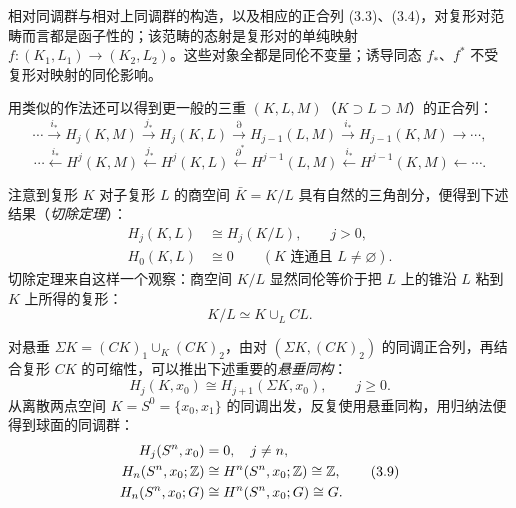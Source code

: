 相对同调群与相对上同调群的构造，以及相应的正合列 (3.3)、(3.4)，对复形对范畴而言都是函子性的；该范畴的态射是复形对的单纯映射 $f:(K_1,L_1)\to(K_2,L_2)$。这些对象全都是同伦不变量；诱导同态 $f_*$、$f^*$ 不受复形对映射的同伦影响。

用类似的作法还可以得到更一般的三重 $(K,L,M)$（$K\supset L\supset M$）的正合列：
\begin{equation}
  \cdots\xrightarrow{i_*}H_j(K,M)\xrightarrow{j_*}H_j(K,L)\xrightarrow{\partial}
  H_{j-1}(L,M)\xrightarrow{i_*}H_{j-1}(K,M)\to\cdots, \tag{3.5}
\end{equation}
\begin{equation}
  \cdots\xleftarrow{i_*}H^j(K,M)\xleftarrow{j_*}H^j(K,L)\xleftarrow{\partial^*}
  H^{j-1}(L,M)\xleftarrow{i_*}H^{j-1}(K,M)\leftarrow\cdots . \tag{3.6}
\end{equation}

注意到复形 $K$ 对子复形 $L$ 的商空间 $\bar K=K/L$ 具有自然的三角剖分，便得到下述结果（\emph{切除定理}）：
\begin{equation}
  \begin{aligned}
    H_j(K,L)&\cong H_j(K/L),\qquad j>0,\\
    H_0(K,L)&\cong 0\qquad(\text{$K$ 连通且 }L\neq\varnothing).
  \end{aligned} \tag{3.7}
\end{equation}
切除定理来自这样一个观察：商空间 $K/L$ 显然同伦等价于把 $L$ 上的锥沿 $L$ 粘到 $K$ 上所得的复形：
\[
  K/L\simeq K\cup_L CL.
\]

对悬垂 $\Sigma K=(CK)_1\cup_K(CK)_2$，由对 $(\Sigma K,(CK)_2)$ 的同调正合列，再结合复形 $CK$ 的可缩性，可以推出下述重要的\emph{悬垂同构}：
\begin{equation}
  H_j(K,x_0)\cong H_{j+1}(\Sigma K,x_0),\qquad j\ge 0. \tag{3.8}
\end{equation}
从离散两点空间 $K=S^0=\{x_0,x_1\}$ 的同调出发，反复使用悬垂同构，用归纳法便得到球面的同调群：
\begin{equation}
  \begin{aligned}
    H_j(S^n,x_0)&=0,\quad j\neq n,\\
    H_n(S^n,x_0;\mathbb{Z})&\cong H^n(S^n,x_0;\mathbb{Z})\cong\mathbb{Z},\\
    H_n(S^n,x_0;G)&\cong H^n(S^n,x_0;G)\cong G.
  \end{aligned} \tag{3.9}
\end{equation}


